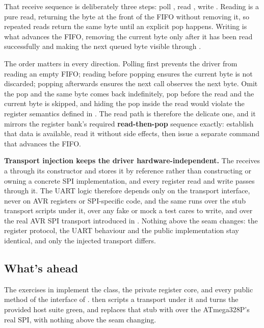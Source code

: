 That receive sequence is deliberately three steps: poll , read , write
. Reading  is a pure read, returning the byte at the front of the FIFO
without removing it, so repeated reads return the same byte until an explicit pop happens. Writing
 is what advances the FIFO, removing the current byte only after it has been read
successfully and making the next queued byte visible through .

The order matters in every direction. Polling first prevents the driver from reading an empty FIFO;
reading before popping ensures the current byte is not discarded; popping afterwards ensures the
next call observes the next byte. Omit the pop and the same byte comes back indefinitely, pop before
the read and the current byte is skipped, and hiding the pop inside the  read would
violate the register semantics defined in . The read path is therefore the delicate
one, and it mirrors the register bank's required \textbf{read-then-pop} sequence exactly: establish
that data is available, read it without side effects, then issue a separate command that advances
the FIFO.

\textbf{Transport injection keeps the driver hardware-independent.} The  receives a
 through its constructor and stores it by reference rather than
constructing or owning a concrete SPI implementation, and every register read and write passes
through it. The UART logic therefore depends only on the transport interface, never on AVR registers
or SPI-specific code, and the same  runs over the stub transport  scripts under
it, over any fake or mock a test cares to write, and over the real AVR SPI transport introduced in
. Nothing above the seam changes: the register protocol, the UART behaviour and the public
 implementation stay identical, and only the injected transport differs.

\subsection{What's ahead}
The exercises in  implement the  class, the private register
core, and every public method of the interface of .  then scripts a transport
under it and turns the provided host suite green, and  replaces that stub with
 over the ATmega328P's real SPI, with nothing above the seam changing.
